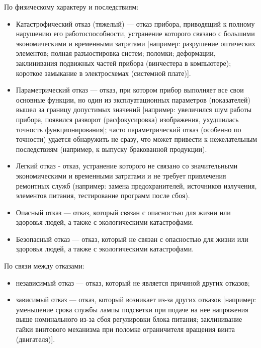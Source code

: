 По физическому характеру и последствиям:
\begin{itemize}
\item Катастрофический отказ (тяжелый) --- отказ прибора, приводящий к полному нарушению его работоспособности, устранение которого связано с большими экономическими и временными затратами [например: разрушение оптических элементов; полная разъюстировка систем; поломки; деформации, заклинивания подвижных частей прибора (винчестера в компьютере); короткое замыкание в электросхемах (системной плате)].
\item Параметрический отказ --- отказ, при котором прибор выполняет все свои основные функции, но один из эксплуатационных параметров (показателей) вышел за границу допустимых значений [например: увеличился шум работы прибора, появился разворот (расфокусировка) изображения, ухудшилась точность функционирования]; часто параметрический отказ (особенно по точности) удается обнаружить не сразу, что может привести к нежелательным последствиям (например, к выпуску бракованной продукции).
\item Легкий отказ - отказ, устранение которого не связано со значительными экономическими и временными затратами и не требует привлечения ремонтных служб (например: замена предохранителей, источников излучения, элементов питания, тестирование программ после сбоя).
\item Опасный отказ --- отказ, который связан с опасностью для жизни или здоровья людей, а также с экологическими катастрофами.
\item Безопасный отказ --- отказ, который не связан с опасностью для жизни или здоровья людей, а также с экологическими катастрофами.
\end{itemize}

По связи между отказами:
\begin{itemize}
\item независимый отказ --- отказ, который не является причиной других отказов;
\item зависимый отказ --- отказ, который возникает из-за других отказов [например: уменьшение срока службы лампы подсветки при подаче на нее напряжения выше номинального из-за сбоя регулировки блока питания; заклинивание гайки винтового механизма при поломке ограничителя вращения винта (двигателя)].
\end{itemize}

